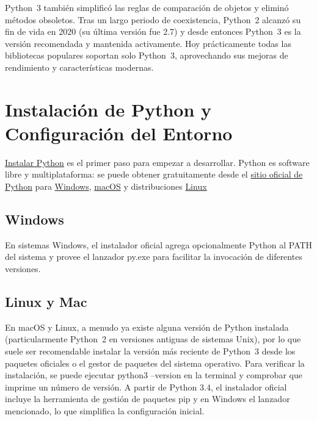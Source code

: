 Python 3 también simplificó las reglas de comparación de objetos y eliminó métodos obsoletos. Tras un largo periodo de coexistencia, 
Python 2 alcanzó su fin de vida en 2020 (su última versión fue 2.7) y desde entonces Python 3 es la versión recomendada y mantenida 
activamente. Hoy prácticamente todas las bibliotecas populares soportan solo Python 3, aprovechando sus mejoras de rendimiento y 
características modernas.



\section{Instalación de Python y Configuración del Entorno}
\href{https://packaging.python.org/en/latest/tutorials/installing-packages/}{Instalar Python} es el primer paso para empezar a desarrollar. Python es software libre y multiplataforma: se puede obtener gratuitamente desde 
el \href{https://www.python.org/downloads/}{sitio oficial de Python} para \href{https://www.python.org/downloads/windows/}{Windows}, \href{https://www.python.org/downloads/macos/}{macOS}
 y distribuciones \href{https://www.python.org/downloads/source/}{Linux}

\subsection{Windows}
En sistemas Windows, el instalador oficial agrega opcionalmente Python al PATH del sistema y provee el lanzador py.exe para facilitar la invocación 
de diferentes versiones. 

\subsection{Linux y Mac}

En macOS y Linux, a menudo ya existe alguna versión de Python instalada (particularmente Python 2 en versiones antiguas de sistemas Unix), 
por lo que suele ser recomendable instalar la versión más reciente de Python 3 desde los paquetes oficiales o el gestor de paquetes del 
sistema operativo. Para verificar la instalación, se puede ejecutar python3 --version en la terminal y comprobar que imprime un número 
de versión. A partir de Python 3.4, el instalador oficial incluye la herramienta de gestión de paquetes pip y en Windows el lanzador mencionado,
lo que simplifica la configuración inicial.

